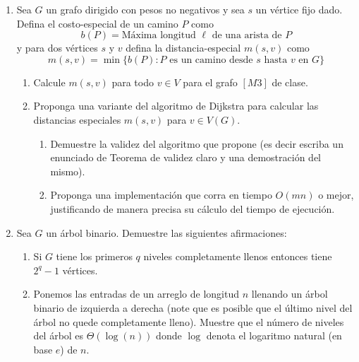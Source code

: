 \documentclass[12pt, a4paper]{article}
\begin{document}
\begin{enumerate}
\item Sea $G$ un grafo dirigido con pesos no negativos y sea $s$ un vértice fijo dado. Defina el costo-especial de un camino $P$ como 
\[b(P)=\text{M\'axima longitud $\ell$ de una arista de $P$}\]
y para dos v\'ertices $s$ y $v$ defina la distancia-especial $m(s,v)$ como
\[m(s,v)=\min\{b(P): \text{$P$ es un camino desde $s$ hasta $v$ en $G$}\}\]
\begin{enumerate}
\item Calcule $m(s,v)$ para todo $v\in V$ para el grafo $[M3]$ de clase.
\item Proponga una variante del algoritmo de Dijkstra para calcular las distancias especiales $m(s,v)$ para $v\in V(G)$.
\begin{enumerate}
\item Demuestre la validez del algoritmo que propone (es decir escriba un enunciado de Teorema de validez claro y una demostración del mismo).
\item Proponga una implementación que corra en tiempo $O(mn)$ o mejor, justificando de manera precisa su cálculo del tiempo de ejecución.
\end{enumerate}
\end{enumerate}


\item Sea $G$ un \'arbol binario. Demuestre las siguientes afirmaciones:
\begin{enumerate}
\item Si $G$ tiene los primeros $q$ niveles completamente llenos entonces tiene $2^{q}-1$ v\'ertices.
\item Ponemos las entradas de un arreglo de longitud $n$ llenando un \'arbol binario  de izquierda a derecha (note que es posible que el último nivel del \'arbol no quede completamente lleno). Muestre que el número de niveles del \'arbol es $\Theta(\log(n))$ donde $\log$ denota el logaritmo natural (en base $e$) de $n$.
\end{enumerate} 

\end{enumerate}
\end{document}
